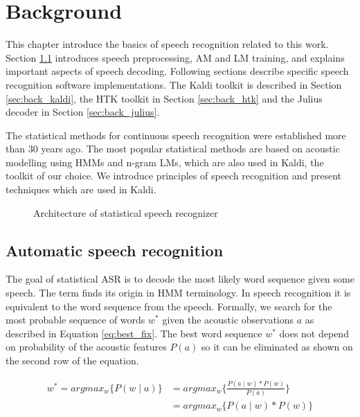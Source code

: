\chapter{Background}
\label{cha:background}
This chapter introduce the basics of speech recognition related to this work. Section \ref{sec:back_asr} introduces speech preprocessing, \acf{AM} and \acf{LM} training, and explains important aspects of speech decoding. Following sections describe specific speech recognition software implementations. The Kaldi toolkit is described in Section \ref{sec:back_kaldi}, the \ac{HTK} toolkit in Section \ref{sec:back_htk} and the Julius decoder in Section \ref{sec:back_julius}.

The statistical methods for continuous speech recognition were established more than 30 years ago. The most popular statistical methods are based on acoustic modelling using \acp{HMM} and n-gram \acp{LM}, which are also used in Kaldi, the toolkit of our choice. We introduce principles of speech recognition and present techniques which are used in Kaldi. 

\begin{figure}[!htp]
  \begin{center}
    
    \caption{Architecture of statistical speech recognizer\cite{ney1990acoustic}}
    \label{fig:components} 
  \end{center}
\end{figure}

\section{Automatic speech recognition}
\label{sec:back_asr}

The goal of statistical \ac{ASR} is to decode the most likely word sequence given some speech. The term  finds its origin in \acs{HMM} terminology. In speech recognition it is equivalent to  the word sequence from the speech. Formally, we search for the most probable sequence of words $w^*$ given the acoustic observations $a$ as described in Equation \ref{eq:best_fix}. The best word sequence $w^*$ does not depend on probability of the acoustic features $P(a)$ so it can be eliminated as shown on the second row of the equation.

\begin{equation}
  \label{eq:best_fix}
  \begin{split}
    w^* = argmax_{w}\{P(w \mid a)\} &= argmax_{w}\{\frac{P(a \mid w) * P(w)}{P(a)}\} \\
                                   &= argmax_{w}\{P(a \mid w) * P(w)\}
  \end{split}
\end{equation}

